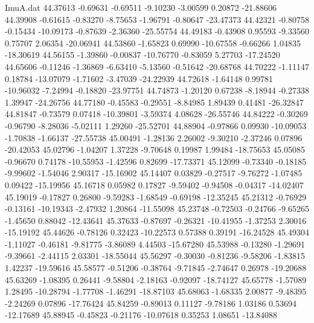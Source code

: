 \begin{filecontents}{ImuA.dat}
  44.37613   -0.69631   -0.69511   -9.10230   -3.00599    0.20872  -21.88606
  44.39908   -0.61615   -0.83270   -8.75653   -1.96791   -0.80647  -23.47373
  44.42321   -0.80758   -0.15434  -10.09173   -0.87639   -2.36360  -25.55754
  44.49183   -0.43908    0.95593   -9.33560    0.75707    2.06354  -20.06941
  44.53860   -1.65823    0.69990  -10.67558   -0.66266    1.04835  -18.30619
  44.56155   -1.39860   -0.00837  -10.76770   -0.83059    5.27703  -17.24520
  44.65606   -0.11246   -1.36869   -6.63410   -5.13560   -0.51642  -20.68768
  44.70222   -1.11147    0.18784  -13.07079   -1.71602   -3.47039  -24.22939
  44.72618   -1.64148    0.99781  -10.96032   -7.24994   -0.18820  -23.97751
  44.74873   -1.20120    0.67238   -8.18944   -0.27338    1.39947  -24.26756
  44.77180   -0.45583   -0.29551   -8.84985    1.89439    0.41481  -26.32847
  44.81847   -0.73579    0.07418  -10.39801   -3.59374    4.08628  -26.55746
  44.84222   -0.30269   -0.96790   -8.28036   -5.02111    1.29260  -25.52701
  44.88904   -0.97866    0.09930  -10.09053   -1.70838   -1.66137  -27.55738
  45.00491   -1.28136    2.26002   -9.30210   -2.37246    0.07896  -20.42053
  45.02796   -1.04207    1.37228   -9.70648    0.19987    1.99484  -18.75653
  45.05085   -0.96670    0.74178  -10.55953   -1.42596    0.82699  -17.73371
  45.12099   -0.73340   -0.18185   -9.99602   -1.54046    2.90317  -15.16902
  45.14407    0.03829   -0.27517   -9.76272   -1.07485    0.09422  -15.19956
  45.16718    0.05982    0.17827   -9.59402   -0.94508   -0.04317  -14.02407
  45.19019   -0.17827    0.26800   -9.59283   -1.68549   -0.69198  -12.35245
  45.21312   -0.76929   -0.13161  -10.19343   -2.47932    1.20864  -11.55098
  45.23748   -0.72503   -0.24766   -9.65265   -1.45650    0.88042  -12.43641
  45.37633   -0.87697   -0.26321  -10.41955   -1.37253    2.30016  -15.19192
  45.44626   -0.78126    0.32423  -10.22573    0.57388    0.39191  -16.24528
  45.49304   -1.11027   -0.46181   -9.81775   -3.86089    4.44503  -15.67280
  45.53988   -0.13280   -1.29691   -9.39661   -2.44115    2.03301  -18.55044
  45.56297   -0.30030   -0.81236   -9.58206   -1.83815    1.42237  -19.59616
  45.58577   -0.51206   -0.38764   -9.71845   -2.74647    0.26978  -19.20688
  45.63269   -1.08395    0.26441   -9.58804   -2.18163   -0.92097  -18.74127
  45.65778   -1.57089    1.28495  -10.28794   -1.77708   -1.46291  -18.87103
  45.68063   -1.68335    2.00877   -9.48395   -2.24269    0.07896  -17.76424
  45.84259   -0.89013    0.11127   -9.78186    1.03186    0.53694  -12.17689
  45.88945   -0.45823   -0.21176  -10.07618    0.35253    1.08651  -13.84088

\end{filecontents}

